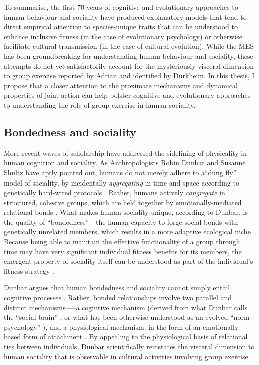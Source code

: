 \begin{CJK}{UTF8}{gbsn}
To summarise, the first 70 years of cognitive and evolutionary approaches to human behaviour and sociality have produced explanatory models that tend to direct empirical attention to species-unique traits that can be understood to enhance inclusive fitness (in the case of evolutionary psychology) or otherwise facilitate cultural transmission (in the case of cultural evolution).  While the MES has been groundbreaking for understanding human behaviour and sociality, these attempts do not yet satisfactorily account for the mysteriously visceral dimension to group exercise reported by Adrian and identified by Durkheim.  In this thesis, I propose that a closer attention to the proximate mechanisms and dynamical properties of joint action can help bolster cognitive and evolutionary approaches to understanding the role of group exercise in human sociality.



\subsection{Bondedness and sociality\label{sect:bondednessSociality}}
More recent waves of scholarship have addressed the sidelining of physicality in human cognition and sociality.  As Anthropologists Robin Dunbar and Susanne Shultz have aptly pointed out, humans do not merely adhere to a``dung fly'' model of sociality, by incidentally \textit{aggregating} in time and space according to genetically hard-wired protocols \citep[see][]{Wilson1975}.  Rather, humans actively \textit{congregate} in structured, cohesive groups, which are held together by emotionally-mediated relational bonds \citep[777]{Dunbar2010}.  What makes human sociality unique, according to Dunbar, is the quality of ``bondedness''---the human capacity to forge social bonds with genetically unrelated members, which results in a more adaptive ecological niche \citep[see][]{Odling-Smee2003}.
Because being able to maintain the effective functionality of a group through time may have very significant individual fitness benefits for its members, the emergent property of sociality itself can be understood as part of the individual's fitness strategy \citep{Dunbar2010b,Nowak2010}.

Dunbar argues that human bondedness and sociality cannot simply entail cognitive processes \citep[at least not in the way cognitive processes are narrowly rendered by game-theoretic and gene-culture coevolutionary models;][]{Dunbar2010}.  Rather, bonded relationships involve two parallel and distinct mechanisms—--a cognitive mechanism (derived from what Dunbar calls the ``social brain'' \citep{Dunbar1998}, or what has been otherwise understood as an evolved ``norm psychology'' \citep{Chudek2011}), and a physiological mechanism, in the form of an emotionally based form of attachment \citep{Dunbar2010b}.  By appealing to the physiological basis of relational ties between individuals, Dunbar scientifically reinstates the visceral dimension to human sociality that is observable in cultural activities involving group exercise.


\end{CJK}
